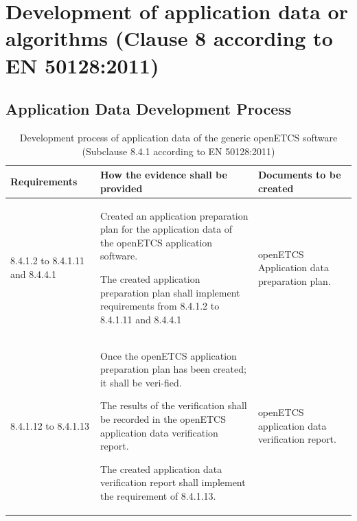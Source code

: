 \documentclass{template/openetcs_report}
\begin{document}
\section{Development of application data or algorithms (Clause 8 according to EN 50128:2011)}
\label{clause82}

\subsection{Application Data Development Process}
{\footnotesize\sffamily\centering
\begin{longtable}{|p{2cm}|p{9cm}|p{3cm}|}
\caption{Development process of application data of the generic openETCS software (Subclause 8.4.1 according to EN 50128:2011)}\\
\hline
\bfseries Requirements & \bfseries How the evidence shall be provided & \bfseries Documents to be created\\
\hline
\hline
\endhead
\hline
\endfoot

8.4.1.2 to 8.4.1.11 and 8.4.4.1 & Created an application preparation plan for the application data of the openETCS application software.

The created application preparation plan shall implement requirements from 8.4.1.2 to 8.4.1.11 and 8.4.4.1
& openETCS Application data preparation plan.\\ 
\hline
8.4.1.12 to 8.4.1.13 & Once the openETCS application preparation plan has been created; it shall be veri-fied.

The results of the verification shall be recorded in the openETCS application data verification report.

The created application data verification report shall implement the requirement of 8.4.1.13.
& openETCS application data verification report.\\ 
\hline
\end{longtable}}
\end{document}
